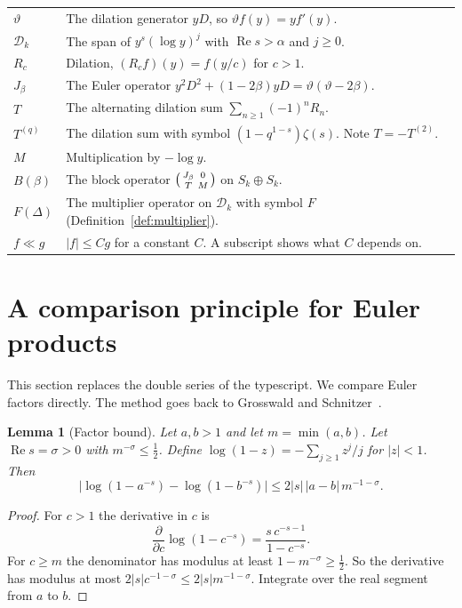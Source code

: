 \documentclass[12pt,letterpaper]{article}
\newtheorem{lemma}[theorem]{Lemma}
\theoremstyle{definition}
\theoremstyle{remark}
\newcommand{\Ree}{\operatorname{Re}}
\newcommand{\Dk}{\mathcal{D}_k}
\newcommand{\yD}{\vartheta}
\begin{document}
\begin{longtable}{@{}p{}p{}@{}}
$\yD$ & The dilation generator $yD$, so $\yD f(y)=yf'(y)$.\\
$\Dk$ & The span of $y^s(\log y)^j$ with $\Ree s>\alpha$ and $j\ge0$.\\
$R_c$ & Dilation, $(R_cf)(y)=f(y/c)$ for $c>1$.\\
$J_\beta$ & The Euler operator $y^2D^2+(1-2\beta)yD=\yD(\yD-2\beta)$.\\
$T$ & The alternating dilation sum $\sum_{n\ge1}(-1)^nR_n$.\\
$T^{(q)}$ & The dilation sum with symbol $(1-q^{1-s})\zeta(s)$. Note
$T=-T^{(2)}$.\\
$M$ & Multiplication by $-\log y$.\\
$B(\beta)$ & The block operator $\begin{psmallmatrix}J_\beta&0\\
T&M\end{psmallmatrix}$ on $S_k\oplus S_k$.\\
$F(\Delta)$ & The multiplier operator on $\Dk$ with symbol $F$
(Definition~\ref{def:multiplier}).\\
$f\ll g$ & $|f|\le Cg$ for a constant $C$. A subscript shows what $C$
depends on.\\
\bottomrule
\end{longtable}


\section{A comparison principle for Euler products}\label{sec:comparison}

This section replaces the double series of the typescript. We compare
Euler factors directly. The method goes back to Grosswald and
Schnitzer~\cite{GS78}.

\begin{lemma}[Factor bound]\label{lem:factor}
Let $a,b>1$ and let $m=\min(a,b)$. Let $\Ree s=\sigma>0$ with
$m^{-\sigma}\le\frac12$. Define $\log(1-z)=-\sum_{j\ge1}z^j/j$ for
$|z|<1$. Then
\[
\bigl|\log(1-a^{-s})-\log(1-b^{-s})\bigr|\le 2|s|\,|a-b|\,m^{-1-\sigma}.
\]
\end{lemma}

\begin{proof}
For $c>1$ the derivative in $c$ is
\[
\frac{\partial}{\partial c}\log(1-c^{-s})=\frac{s\,c^{-s-1}}{1-c^{-s}}.
\]
For $c\ge m$ the denominator has modulus at least $1-m^{-\sigma}\ge\frac12$.
So the derivative has modulus at most $2|s|c^{-1-\sigma}\le2|s|m^{-1-\sigma}$.
Integrate over the real segment from $a$ to $b$.
\end{proof}
\end{document}
